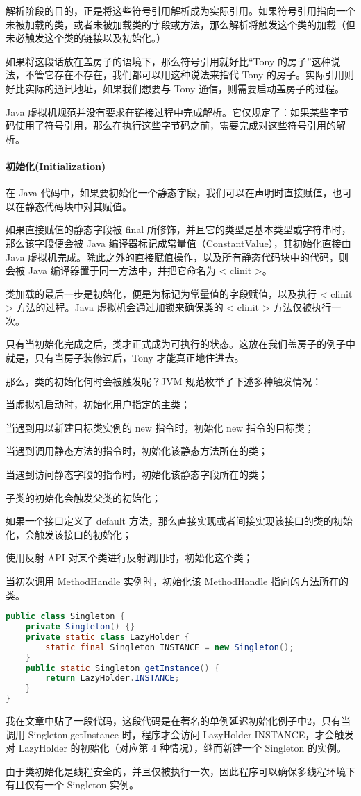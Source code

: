 \documentclass[../../../interview-questions.tex]{subfiles}
\begin{document}
解析阶段的目的，正是将这些符号引用解析成为实际引用。如果符号引用指向一个未被加载的类，或者未被加载类的字段或方法，那么解析将触发这个类的加载（但未必触发这个类的链接以及初始化。）

如果将这段话放在盖房子的语境下，那么符号引用就好比“Tony 的房子”这种说法，不管它存在不存在，我们都可以用这种说法来指代 Tony 的房子。实际引用则好比实际的通讯地址，如果我们想要与 Tony 通信，则需要启动盖房子的过程。

Java 虚拟机规范并没有要求在链接过程中完成解析。它仅规定了：如果某些字节码使用了符号引用，那么在执行这些字节码之前，需要完成对这些符号引用的解析。

\paragraph{初始化(Initialization)}

在 Java 代码中，如果要初始化一个静态字段，我们可以在声明时直接赋值，也可以在静态代码块中对其赋值。

如果直接赋值的静态字段被 final 所修饰，并且它的类型是基本类型或字符串时，那么该字段便会被 Java 编译器标记成常量值（ConstantValue），其初始化直接由 Java 虚拟机完成。除此之外的直接赋值操作，以及所有静态代码块中的代码，则会被 Java 编译器置于同一方法中，并把它命名为 < clinit >。

类加载的最后一步是初始化，便是为标记为常量值的字段赋值，以及执行 < clinit > 方法的过程。Java 虚拟机会通过加锁来确保类的 < clinit > 方法仅被执行一次。

只有当初始化完成之后，类才正式成为可执行的状态。这放在我们盖房子的例子中就是，只有当房子装修过后，Tony 才能真正地住进去。

那么，类的初始化何时会被触发呢？JVM 规范枚举了下述多种触发情况：

当虚拟机启动时，初始化用户指定的主类；

当遇到用以新建目标类实例的 new 指令时，初始化 new 指令的目标类；

当遇到调用静态方法的指令时，初始化该静态方法所在的类；

当遇到访问静态字段的指令时，初始化该静态字段所在的类；

子类的初始化会触发父类的初始化；

如果一个接口定义了 default 方法，那么直接实现或者间接实现该接口的类的初始化，会触发该接口的初始化；

使用反射 API 对某个类进行反射调用时，初始化这个类；

当初次调用 MethodHandle 实例时，初始化该 MethodHandle 指向的方法所在的类。

\begin{lstlisting}[language=Java]
public class Singleton {
    private Singleton() {}
    private static class LazyHolder {
        static final Singleton INSTANCE = new Singleton();
    }
    public static Singleton getInstance() {
        return LazyHolder.INSTANCE;
    }
}
\end{lstlisting}

我在文章中贴了一段代码，这段代码是在著名的单例延迟初始化例子中2，只有当调用 Singleton.getInstance 时，程序才会访问 LazyHolder.INSTANCE，才会触发对 LazyHolder 的初始化（对应第 4 种情况），继而新建一个 Singleton 的实例。

由于类初始化是线程安全的，并且仅被执行一次，因此程序可以确保多线程环境下有且仅有一个 Singleton 实例。
\end{document}
